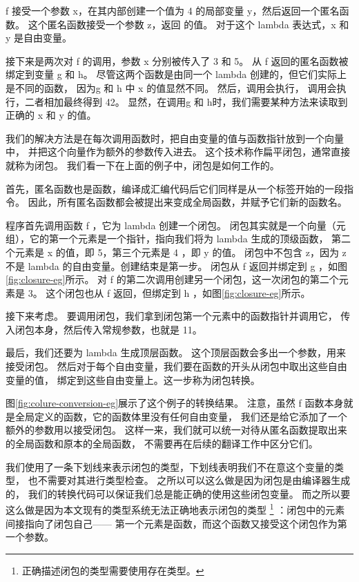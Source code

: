 f 接受一个参数 x，在其内部创建一个值为 4 的局部变量 y，然后返回一个匿名函数。
这个匿名函数接受一个参数 z，返回  的值。
对于这个 lambda 表达式，x 和 y 是自由变量。

接下来是两次对 f 的调用，参数 x 分别被传入了 3 和 5。
从 f 返回的匿名函数被绑定到变量 g 和 h。
尽管这两个函数是由同一个 lambda 创建的，但它们实际上是不同的函数，
因为g 和 h 中 x 的值显然不同。
然后，调用会执行，
调用会执行，二者相加最终得到 42。
显然，在调用g 和 h时，我们需要某种方法来读取到正确的 x 和 y 的值。

我们的解决方法是在每次调用函数时，把自由变量的值与函数指针放到一个向量中，
并把这个向量作为额外的参数传入进去。
这个技术称作扁平闭包\cite{Cardelli_1983}，通常直接就称为闭包。
我们看一下在上面的例子中，闭包是如何工作的。

首先，匿名函数也是函数，编译成汇编代码后它们同样是从一个标签开始的一段指令。
因此，所有匿名函数都会被提出来变成全局函数，并赋予它们新的函数名。

程序首先调用函数 f ，它为 lambda 创建一个闭包。
闭包其实就是一个向量（元组），它的第一个元素是一个指针，指向我们将为 lambda 生成的顶级函数，
第二个元素是 x 的值，即 5，第三个元素是 4 ，即 y 的值。
闭包中不包含 z，因为 z 不是 lambda 的自由变量。创建结束是第一步。
闭包从 f 返回并绑定到 g ，如图\ref{fig:closure-eg}所示。
对 f 的第二次调用创建另一个闭包，这一次闭包的第二个元素是 3。
这个闭包也从 f 返回，但绑定到 h ，如图\ref{fig:closure-eg}所示。

接下来考虑。
要调用闭包，我们拿到闭包第一个元素中的函数指针并调用它，
传入闭包本身，然后传入常规参数，也就是 11。

最后，我们还要为 lambda 生成顶层函数。
这个顶层函数会多出一个参数，用来接受闭包。
然后对于每个自由变量，我们要在函数的开头从闭包中取出这些自由变量的值，
绑定到这些自由变量上。这一步称为闭包转换。

图\ref{fig:colure-conversion-eg}展示了这个例子的转换结果。
注意，虽然 f 函数本身就是全局定义的函数，它的函数体里没有任何自由变量，
我们还是给它添加了一个额外的参数用以接受闭包。
这样一来，我们就可以统一对待从匿名函数提取出来的全局函数和原本的全局函数，
不需要再在后续的翻译工作中区分它们。

我们使用了一条下划线来表示闭包的类型，下划线表明我们不在意这个变量的类型，
也不需要对其进行类型检查。
之所以可以这么做是因为闭包是由编译器生成的，
我们的转换代码可以保证我们总是能正确的使用这些闭包变量。
而之所以要这么做是因为本文现有的类型系统无法正确地表示闭包的类型
\footnote{正确描述闭包的类型需要使用存在类型\cite{Minamide_Morrisett_Harper_1996}。}
：闭包中的元素间接指向了闭包自己——
第一个元素是函数，而这个函数又接受这个闭包作为第一个参数。

